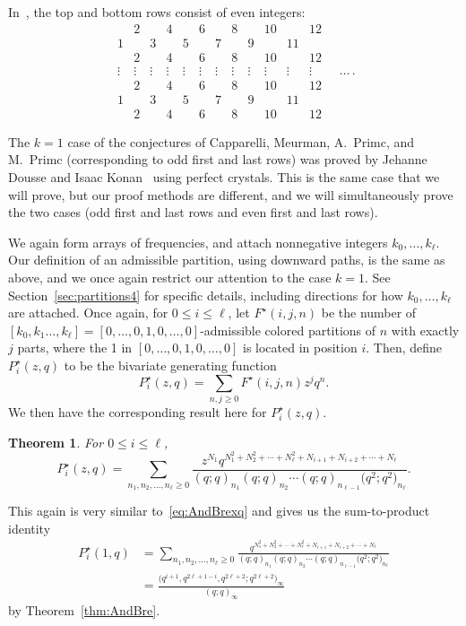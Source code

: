 \documentclass[pdftex]{sigma}
\numberwithin{equation}{section}
\newtheorem{Theorem}{Theorem}[section]
\theoremstyle{definition}
\begin{document}
In~\cite{primc2023}, the top and bottom rows consist of even integers:
\begin{equation*}
\begin{matrix}
& 2 && 4 && 6 && 8 && 10 && 12\\
1 && 3 && 5 && 7 && 9 && 11 & \\
& 2 && 4 && 6 && 8 && 10 && 12\\
\vdots & \vdots &\vdots& \vdots &\vdots& \vdots &\vdots& \vdots &\vdots& \vdots &\vdots& \vdots\\
& 2 && 4 && 6 && 8 && 10 && 12 \\
1 && 3 && 5 && 7 && 9 && 11 & \\
& 2 && 4 && 6 && 8 && 10 && 12
 \end{matrix}\quad\dots\,.
\end{equation*}

The $k=1$ case of the conjectures of Capparelli, Meurman, A.~Primc, and M.~Primc (corresponding to odd first and last rows) was proved by Jehanne Dousse and Isaac Konan~\cite{DouKon} using perfect crystals. This is the same case that we will prove, but our proof methods are different, and we will simultaneously prove the two cases (odd first and last rows and even first and last rows).

We again form arrays of frequencies, and attach nonnegative integers $k_0,\dots,k_\ell$. Our definition of an admissible partition, using downward paths, is the same as above, and we once again restrict our attention to the case $k=1$. See Section~\ref{sec:partitions4} for specific details, including directions for how $k_0,\dots,k_\ell$ are attached. Once again, for $0 \le i \le \ell$, let $F^\star(i,j,n)$ be the number of $\left[k_0,k_1\dots,k_\ell\right]=\left[0,\dots,0,1,0,\dots,0\right]$-admissible colored partitions of $n$ with exactly $j$ parts, where the 1 in $\left[0,\dots,0,1,0,\dots,0\right]$ is located in position $i$. Then, define $P^\star_{i}(z,q)$ to be the bivariate generating function
\begin{equation*}
P^\star_{i}(z,q)=\sum_{n,j\ge 0} F^\star(i,j,n)z^j q^n.
\end{equation*}
We then have the corresponding result here for $P^\star_i(z,q)$.
\begin{Theorem} \label{thm:mainresult2}
For $0\le i \le \ell$,
\begin{equation} \label{eq:mainresult2}
P^\star_i(z,q)=\sum_{n_1,n_2,\dots,n_{\ell}\ge 0} \frac{z^{N_1}q^{N_1^2+N_2^2+\cdots+N_{\ell}^2+N_{i+1}+N_{i+2}+\cdots+N_{\ell}}}{(q;q)_{n_1}(q;q)_{n_2}\cdots(q;q)_{n_{\ell-1}}\bigl(q^2;q^2\bigr)_{n_{\ell}}}.
\end{equation}
\end{Theorem}
This again is very similar to~\eqref{eq:AndBrexq} and gives us the sum-to-product identity
\begin{align}
P^\star_i(1,q)& =\sum_{n_1,n_2,\dots,n_{\ell}\ge 0} \frac{q^{N_1^2+N_2^2+\cdots+N_{\ell}^2+N_{i+1}+N_{i+2}+\cdots+N_{\ell}}}{(q;q)_{n_1}(q;q)_{n_2}
\cdots(q;q)_{n_{\ell-1}}\bigl(q^2;q^2\bigr)_{n_{\ell}}}\nonumber\\
& = \frac{\bigl(q^{i+1},q^{2\ell+1-i},q^{2\ell+2};q^{2\ell+2}\bigr)_\infty}{(q;q)_\infty}\label{eq:sumprod2}
\end{align}
by Theorem~\ref{thm:AndBre}.
\end{document}
